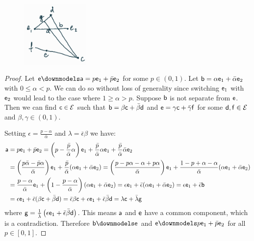 \begin{figure}[h]
	\centering
	\includegraphics[width=0.3\textwidth]{tempimages/DistinctAndMixture.jpg}
\end{figure}

\begin{proof}
	Let $\ens \separate \ens[a] = p \ens_1 + \bar{p} \ens_2$ for some $p \in (0, 1)$. Let $\ens[b] = \alpha \ens_1 + \bar{\alpha} \ens_2$ with $0 \leq \alpha < p$. We can do so without loss of generality since switching $\ens_1$ with $\ens_2$ would lead to the case where $1 \geq \alpha > p$. Suppose $\ens[b]$ is not separate from $\ens$. Then we can find $\ens[c] \in \Ens$ such that $\ens[b] = \beta \ens[c] + \bar{\beta} \ens[d]$ and $\ens = \gamma \ens[c] + \bar{\gamma} \ens[f]$ for some $\ens[d], \ens[f] \in \Ens$ and $\beta, \gamma \in (0, 1)$.
	
	Setting $\epsilon = \frac{p - \alpha}{\bar{\alpha}}$ and $\lambda = \bar{\epsilon} \beta$ we have:
	\begin{align*}
		\ens[a] &= p \ens_1 + \bar{p} \ens_2 = \left(p - \frac{\bar{p}}{\bar{\alpha}} \alpha \right) \ens_1 + \frac{\bar{p}}{\bar{\alpha}} \alpha \ens_1 + \frac{\bar{p}}{\bar{\alpha}} \bar{\alpha}\ens_2 \\
		&= \left(\frac{p\bar{\alpha} - \bar{p}\alpha}{\bar{\alpha}} \right) \ens_1 + \frac{\bar{p}}{\bar{\alpha}} (\alpha \ens_1 + \bar{\alpha} \ens_2) = \left(\frac{p - p\alpha - \alpha + p \alpha}{\bar{\alpha}} \right) \ens_1 + \frac{1 - p + \alpha - \alpha}{\bar{\alpha}} (\alpha \ens_1 + \bar{\alpha} \ens_2) \\
		&= \frac{p - \alpha}{\bar{\alpha}}  \ens_1 + \left( 1 - \frac{p - \alpha}{\bar{\alpha}}\right) (\alpha \ens_1 + \bar{\alpha} \ens_2) = \epsilon \ens_1 + \bar{\epsilon} (\alpha \ens_1 + \bar{\alpha} \ens_2) = \epsilon \ens_1 + \bar{\epsilon} \ens[b] \\
		&= \epsilon \ens_1 + \bar{\epsilon} ( \beta \ens[c] + \bar{\beta} \ens[d] ) = \bar{\epsilon} \beta \ens[c] + \epsilon \ens_1 + \bar{\epsilon} \bar{\beta} \ens[d] = \lambda \ens[c] + \bar{\lambda} \ens[g]
	\end{align*}
	where $\ens[g] = \frac{1}{\bar{\lambda}}\left( \epsilon \ens_1 + \bar{\epsilon} \bar{\beta} \ens[d] \right)$. This means $\ens[a]$ and $\ens$ have a common component, which is a contradiction. Therefore $\ens[b] \separate \ens$ and $\ens \separate p \ens_1 + \bar{p} \ens_2$ for all $p \in [0, 1]$.
\end{proof}

